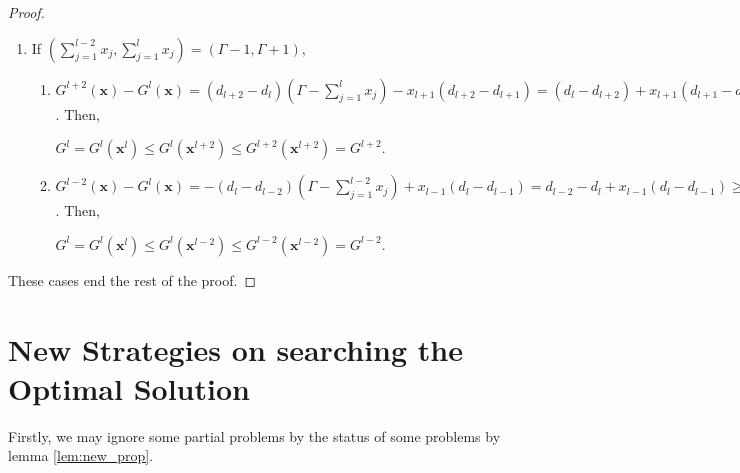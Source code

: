 \documentclass[letterpaper, 10pt]{article}
\renewcommand{\vec}[1]{\bm{#1}}
\begin{document}
\begin{proof}
\begin{enumerate}
\begin{enumerate}
			\begin{center}
				$G^{l} = G^{l}(\vec{x}^{l}) \le G^{l}(\vec{x}^{l+2}) \le G^{l+2}(\vec{x}^{l+2}) = G^{l+2}$.
			\end{center}
			\item $G^{l-2}(\vec{x}) - G^{l}(\vec{x}) = -(d_{l} - d_{l-2}) \left( \Gamma - \sum\limits_{j=1}^{l-2}{x_{j}} \right) + x_{l-1}(d_{l} - d_{l-1}) =  d_{l-2} - d_{l} + x_{l-1}(d_{l} - d_{l-1}) \ge d_{l-2} - d_{l} + d_{l} - d_{l-1} = (d_{l-2} - d_{l-1}) \ge 0$. Then,
			\begin{center}
				$G^{l} = G^{l}(\vec{x}^{l}) \le G^{l}(\vec{x}^{l-2}) \le G^{l-2}(\vec{x}^{l-2}) = G^{l-2}$.
			\end{center}
		\end{enumerate}
		\item If $\left( \sum\limits_{j=1}^{l-2}{x_{j}}, \sum\limits_{j=1}^{l}{x_{j}}  \right) = (\Gamma - 1, \Gamma+1)$,
		\begin{enumerate}
			\item $G^{l+2}(\vec{x}) - G^{l}(\vec{x}) = (d_{l+2} - d_{l}) \left( \Gamma - \sum\limits_{j=1}^{l}{x_{j}} \right) - x_{l+1}(d_{l+2} - d_{l+1}) = (d_{l} - d_{l+2}) + x_{l+1}(d_{l+1} - d_{l+2}) \ge 0$. Then,
			\begin{center}
				$G^{l} = G^{l}(\vec{x}^{l}) \le G^{l}(\vec{x}^{l+2}) \le G^{l+2}(\vec{x}^{l+2}) = G^{l+2}$.
			\end{center}
			\item $G^{l-2}(\vec{x}) - G^{l}(\vec{x}) = -(d_{l} - d_{l-2}) \left( \Gamma - \sum\limits_{j=1}^{l-2}{x_{j}} \right) + x_{l-1}(d_{l} - d_{l-1}) =  d_{l-2} - d_{l} + x_{l-1}(d_{l} - d_{l-1}) \ge d_{l-2} - d_{l} + d_{l} - d_{l-1} = (d_{l-2} - d_{l-1}) \ge 0$. Then,
			\begin{center}
				$G^{l} = G^{l}(\vec{x}^{l}) \le G^{l}(\vec{x}^{l-2}) \le G^{l-2}(\vec{x}^{l-2}) = G^{l-2}$.
			\end{center}
		\end{enumerate}
	\end{enumerate}
	These cases end the rest of the proof.
\end{proof}

\section{New Strategies on searching the Optimal Solution}
Firstly, we may ignore some partial problems by the status of some problems by lemma \ref{lem:new_prop}.
\end{document}
